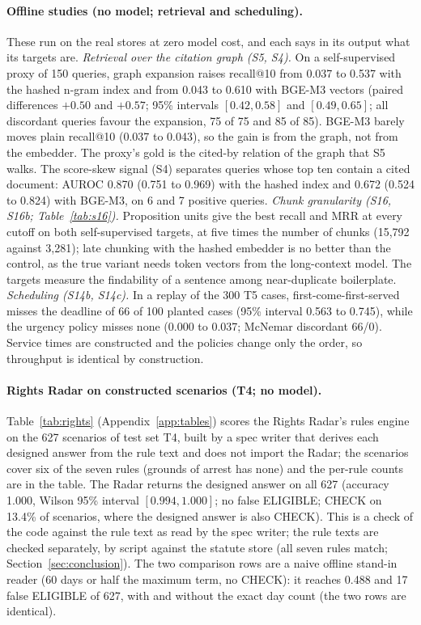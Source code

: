 \paragraph{Offline studies (no model; retrieval and scheduling).} These run on the real stores at zero model cost, and each says in its output what its targets are. \emph{Retrieval over the citation graph (S5, S4).} On a self-supervised proxy of 150 queries, graph expansion raises recall@10 from 0.037 to 0.537 with the hashed n-gram index and from 0.043 to 0.610 with BGE-M3 vectors (paired differences $+0.50$ and $+0.57$; 95\% intervals $[0.42, 0.58]$ and $[0.49, 0.65]$; all discordant queries favour the expansion, 75 of 75 and 85 of 85). BGE-M3 barely moves plain recall@10 (0.037 to 0.043), so the gain is from the graph, not from the embedder. The proxy's gold is the cited-by relation of the graph that S5 walks. The score-skew signal (S4) separates queries whose top ten contain a cited document: AUROC 0.870 (0.751 to 0.969) with the hashed index and 0.672 (0.524 to 0.824) with BGE-M3, on 6 and 7 positive queries. \emph{Chunk granularity (S16, S16b; Table~\ref{tab:s16}).} Proposition units give the best recall and MRR at every cutoff on both self-supervised targets, at five times the number of chunks (15,792 against 3,281); late chunking with the hashed embedder is no better than the control, as the true variant needs token vectors from the long-context model. The targets measure the findability of a sentence among near-duplicate boilerplate. \emph{Scheduling (S14b, S14c).} In a replay of the 300 T5 cases, first-come-first-served misses the deadline of 66 of 100 planted cases (95\% interval 0.563 to 0.745), while the urgency policy misses none (0.000 to 0.037; McNemar discordant 66/0). Service times are constructed and the policies change only the order, so throughput is identical by construction.
\paragraph{Rights Radar on constructed scenarios (T4; no model).} Table~\ref{tab:rights} (Appendix~\ref{app:tables}) scores the Rights Radar's rules engine on the 627 scenarios of test set T4, built by a spec writer that derives each designed answer from the rule text and does not import the Radar; the scenarios cover six of the seven rules (grounds of arrest has none) and the per-rule counts are in the table. The Radar returns the designed answer on all 627 (accuracy 1.000, Wilson 95\% interval $[0.994, 1.000]$; no false ELIGIBLE; CHECK on 13.4\% of scenarios, where the designed answer is also CHECK). This is a check of the code against the rule text as read by the spec writer; the rule texts are checked separately, by script against the statute store (all seven rules match; Section~\ref{sec:conclusion}). The two comparison rows are a naive offline stand-in reader (60 days or half the maximum term, no CHECK): it reaches 0.488 and 17 false ELIGIBLE of 627, with and without the exact day count (the two rows are identical).

